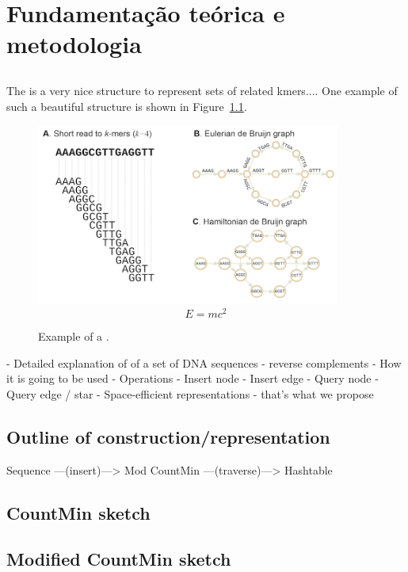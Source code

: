\chapter{Fundamentação teórica e metodologia}

\section{\dBG}

The \dBG is a very nice structure to represent sets of related kmers.... One example of such a beautiful structure is shown in Figure~\ref{fig:dbgexample}.

\begin{figure}[htbp]
	\begin{center}
\includegraphics[width=10cm]{dbg}
$$E=mc^2$$
	\end{center}
	\caption{Example of a \dBG.}\label{fig:dbgexample}
\end{figure}


- Detailed explanation of \dBG of a set of DNA sequences
  - reverse complements
- How it is going to be used
- Operations
  - Insert node
  - Insert edge
  - Query node
  - Query edge / star 
- Space-efficient representations - that's what we propose

\section{Outline of construction/representation}

Sequence ---(insert)---> Mod CountMin ---(traverse)---> Hashtable 


\section{CountMin sketch}

\section{Modified CountMin sketch}


